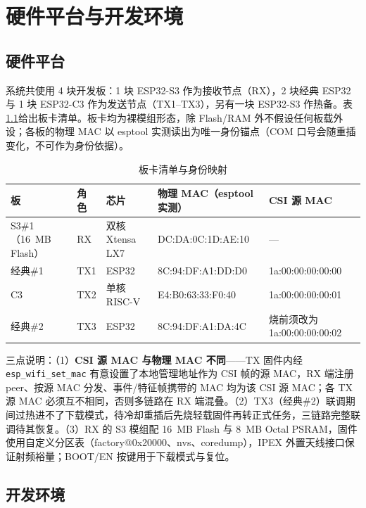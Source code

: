 \chapter{硬件平台与开发环境}\label{chap:hw}

\section{硬件平台}\label{sec:boardsec}

系统共使用 4 块开发板：1 块 ESP32-S3 作为接收节点（RX），2 块经典 ESP32 与 1 块 ESP32-C3 作为发送节点（TX1--TX3），另有一块 ESP32-S3 作热备。表\ref{tab:board}给出板卡清单。板卡均为裸模组形态，除 Flash/RAM 外不假设任何板载外设；各板的物理 MAC 以 esptool 实测读出为唯一身份锚点（COM 口号会随重插变化，不可作为身份依据）。

\begin{table}[htbp]
  \centering
  \caption{板卡清单与身份映射}
  \label{tab:board}
  \begin{tabular}{p{2.3cm}p{1.0cm}p{2.9cm}p{3.7cm}p{3.1cm}}
    \toprule
    \textbf{板} & \textbf{角色} & \textbf{芯片} & \textbf{物理 MAC（esptool 实测）} & \textbf{CSI 源 MAC} \\
    \midrule
    S3\#1（16~MB Flash） & RX & 双核 Xtensa LX7 & DC:DA:0C:1D:AE:10 & --- \\
    经典\#1 & TX1 & ESP32 & 8C:94:DF:A1:DD:D0 & 1a:00:00:00:00:00 \\
    C3 & TX2 & 单核 RISC-V & E4:B0:63:33:F0:40 & 1a:00:00:00:00:01 \\
    经典\#2 & TX3 & ESP32 & 8C:94:DF:A1:DA:4C & 烧前须改为 1a:00:00:00:00:02 \\
    \bottomrule
  \end{tabular}
\end{table}

三点说明：（1）\textbf{CSI 源 MAC 与物理 MAC 不同}——TX 固件内经 \texttt{esp\_wifi\_set\_mac} 有意设置了本地管理地址作为 CSI 帧的源 MAC，RX 端注册 peer、按源 MAC 分发、事件/特征帧携带的 MAC 均为该 CSI 源 MAC；各 TX 源 MAC 必须互不相同，否则多链路在 RX 端混叠。（2）TX3（经典\#2）联调期间过热进不了下载模式，待冷却重插后先烧轻载固件再转正式任务，三链路完整联调待其恢复。（3）RX 的 S3 模组配 16~MB Flash 与 8~MB Octal PSRAM，固件使用自定义分区表（factory@0x20000、nvs、coredump），IPEX 外置天线接口保证射频裕量；BOOT/EN 按键用于下载模式与复位。

\section{开发环境}

